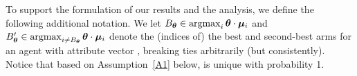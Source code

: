 
To support the formulation of our results and the analysis,
we define the following additional notation.
We let
$B_{\bm{\theta}} \in \mathop{\mathrm{argmax}}_i \bm{\theta} \cdot \bm{\mu}_{i}$
and
$ B'_{\bm{\theta}} \in \mathop{\mathrm{argmax}}_{i \neq B_{\bm{\theta}}} \bm{\theta} \cdot \bm{\mu}_{i}$
denote the (indices of) the best and second-best arms for an agent
with attribute vector \AgV,
breaking ties arbitrarily (but consistently).
Notice that based on Assumption~\ref{A1} below,
\Best{\AgV} is unique with probability 1.


